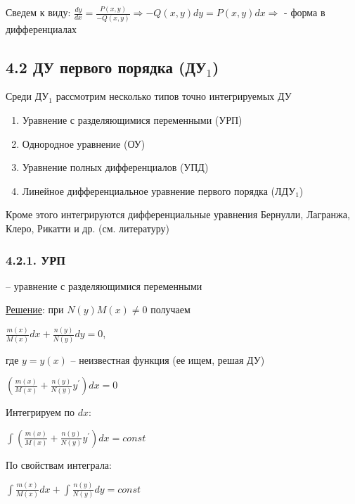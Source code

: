 \documentclass[12pt]{article}
\begin{document}
    Сведем к виду: $\frac{dy}{dx} = \frac{P(x, y)}{-Q(x, y)} \Longrightarrow -Q(x, y)dy = P(x, y)dx \Longrightarrow $
     - форма в дифференциалах


    \subsection{4.2 ДУ первого порядка (ДУ$_1$)}

    \Nota Среди ДУ$_1$ рассмотрим несколько типов точно интегрируемых ДУ

    \begin{enumerate}
        \item Уравнение с разделяющимися переменными (УРП)

        \item Однородное уравнение (ОУ)

        \item Уравнение полных дифференциалов (УПД)

        \item Линейное дифференциальное уравнение первого порядка (ЛДУ$_1$)
    \end{enumerate}
    Кроме этого интегрируются дифференциальные уравнения Бернулли, Лагранжа, Клеро, Рикатти и др. (см. литературу)

    \hypertarget{equationwithseparablevariables}{}

    \subsubsection{4.2.1. УРП}

    \Def {} -- уравнение с разделяющимися переменными

    \underline{Решение}: при $N(y)M(x) \neq 0$ получаем

    $\frac{m(x)}{M(x)}dx + \frac{n(y)}{N(y)}dy = 0$,
    
    где $y = y(x)$ -- неизвестная функция (ее ищем, решая ДУ)

    $\left(\frac{m(x)}{M(x)} + \frac{n(y)}{N(y)}y^\prime\right)dx = 0$

    Интегрируем по $dx$:

    $\int \left(\frac{m(x)}{M(x)} + \frac{n(y)}{N(y)}y^\prime\right)dx = const$

    По свойствам интеграла:

    $\int \frac{m(x)}{M(x)}dx + \int\frac{n(y)}{N(y)}dy = const$
\end{document}
